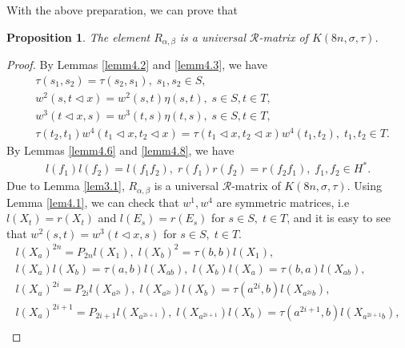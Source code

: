 \documentclass[a4paper,11pt]{amsart}
\numberwithin{equation}{section}
\newtheorem{proposition}[theorem]{Proposition}
\begin{document}
With the above preparation, we can prove that
\begin{proposition} \label{pro4.1} The element
$R_{\alpha,\beta}$ is a universal $\mathcal{R}$-matrix of $K(8n,\sigma,\tau)$.
\end{proposition}
\begin{proof}
By Lemmas \ref{lemm4.2} and \ref{lemm4.3}, we have
\begin{align*}
&\tau(s_1,s_2)=\tau(s_2,s_1),\; s_1,s_2\in S,\\
&w^2(s,t\triangleleft x)=w^2(s,t)\eta(s,t),\; s \in S,t\in T,\\
&w^3(t\triangleleft x,s)=w^3(t,s)\eta(t,s),\;s \in S,t\in T,\\
&\tau(t_2,t_1)w^4(t_1\triangleleft x,t_2\triangleleft x)=\tau(t_1\triangleleft x,t_2\triangleleft x)w^4(t_1,t_2),\;t_1,t_2 \in T.
\end{align*}
By Lemmas \ref{lemm4.6} and  \ref{lemm4.8}, we have
\begin{gather*}
l(f_1)l(f_2)=l(f_1f_2),\;r(f_1)r(f_2)=r(f_2f_1),\;f_1,f_2\in H^*.
\end{gather*}
 Due to Lemma \ref{lem3.1},  $R_{\alpha,\beta}$ is a universal $\mathcal{R}$-matrix of $K(8n,\sigma,\tau)$.
\iffalse
Using Lemma \ref{lem4.1}, we can check that $w^1,w^4$ are symmetric matrices, i.e $l(X_t)=r(X_t)$ and $l(E_s)=r(E_s)$ for $s\in S,\;t\in T$, and it is easy to see that $w^2(s,t)=w^3(t\triangleleft x,s)$ for $s\in S,\;t\in T$.
\begin{gather}
\label{e4.30} l(X_a)^{2n}=P_{2n}l(X_1),\;l(X_b)^2=\tau(b,b)l(X_1),\\
\label{e4.32} l(X_a)l(X_b)=\tau(a,b)l(X_{ab}),\;l(X_b)l(X_a)=\tau(b,a)l(X_{ab}),\\
\label{e4.34} l(X_a)^{2i}=P_{2i}l(X_{a^{2i}}),\; l(X_{a^{2i}})l(X_b)=\tau(a^{2i},b)l(X_{a^{2i}b}),\\
\label{e4.36} l(X_a)^{2i+1}=P_{2i+1}l(X_{a^{2i+1}}),\; l(X_{a^{2i+1}})l(X_b)=\tau(a^{2i+1},b)l(X_{a^{2i+1}b}),\\

\end{gather}
\end{proof}
\end{document}
